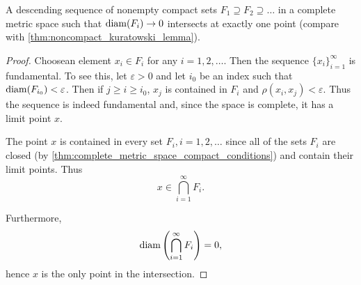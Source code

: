 \begin{theorem}\label{thm:cantors_nested_compact_theorem}
  A descending sequence of nonempty compact sets \( F_1 \supseteq F_2 \supseteq \ldots \) in a complete metric space such that \( \operatorname{diam}(F_i) \to 0 \) intersects at exactly one point (compare with \cref{thm:noncompact_kuratowski_lemma}).
\end{theorem}
\begin{proof}
  Choose\AOC an element \( x_i \in F_i \) for any \( i = 1, 2, \ldots \). Then the sequence \( \{ x_i \}_{i=1}^\infty \) is fundamental. To see this, let \( \varepsilon > 0 \) and let \( i_0 \) be an index such that \( \operatorname{diam}(F_{i_0}) < \varepsilon \). Then if \( j \geq i \geq i_0 \), \( x_j \) is contained in \( F_i \) and \( \rho(x_i, x_j) < \varepsilon \). Thus the sequence is indeed fundamental and, since the space is complete, it has a limit point \( x \).

  The point \( x \) is contained in every set \( F_i, i = 1, 2, \ldots \) since all of the sets \( F_i \) are closed (by \cref{thm:complete_metric_space_compact_conditions}) and contain their limit points. Thus
  \begin{equation*}
    x \in \bigcap_{i=1}^\infty F_i.
  \end{equation*}

  Furthermore,
  \begin{equation*}
    \operatorname{diam}\left( \bigcap_{i=1}^\infty F_i \right) = 0,
  \end{equation*}
  hence \( x \) is the only point in the intersection.
\end{proof}

